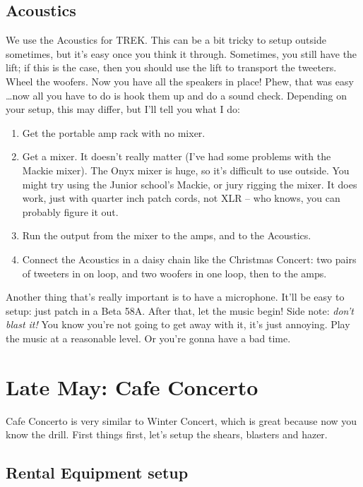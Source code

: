 \documentclass[letterpaper,10pt,oneside,headsepline]{scrreprt}
\begin{document}
\subsection{Acoustics}
We use the Acoustics for TREK. This can be a bit tricky to setup outside sometimes, but it's easy once you think it through. Sometimes, you still have the lift; if this is the case, then you should use the lift to transport the tweeters. Wheel the woofers. Now you have all the speakers in place! Phew, that was easy \ldots now all you have to do is hook them up and do a sound check. Depending on your setup, this may differ, but I'll tell you what I do:
\begin{enumerate}
\item Get the portable amp rack with no mixer.
\item Get a mixer. It doesn't really matter (I've had some problems with the Mackie mixer). The Onyx mixer is huge, so it's difficult to use outside. You might try using the Junior school's Mackie, or jury rigging the mixer. It does work, just with quarter inch patch cords, not XLR -- who knows, you can probably figure it out.
\item Run the output from the mixer to the amps, and to the Acoustics. 
\item Connect the Acoustics in a daisy chain like the Christmas Concert: two pairs of tweeters in on loop, and two woofers in one loop, then to the amps.
\end{enumerate} 
Another thing that's really important is to have a microphone. It'll be easy to setup: just patch in a Beta 58A. After that, let the music begin! Side note: \textit{don't blast it!} You know you're not going to get away with it, it's just annoying. Play the music at a reasonable level. Or you're gonna have a bad time. 

\section{Late May: Cafe Concerto}
Cafe Concerto is very similar to Winter Concert, which is great because now you know the drill. First things first, let's setup the shears, blasters and hazer.

\subsection{Rental Equipment setup}
%

\end{document}
